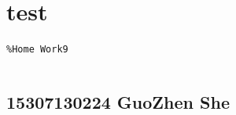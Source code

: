 \documentclass[10pt]{article}
\begin{document}
{\Huge\section*{test}}

\tableofcontents
\vspace*{4em}

\begin{lstlisting}
%Home Work9
\end{lstlisting}
\begin{lstlisting}[language={},xleftmargin=5pt,frame=none]

\end{lstlisting}


{}
\subsection*{15307130224 GuoZhen She}
\end{document}
